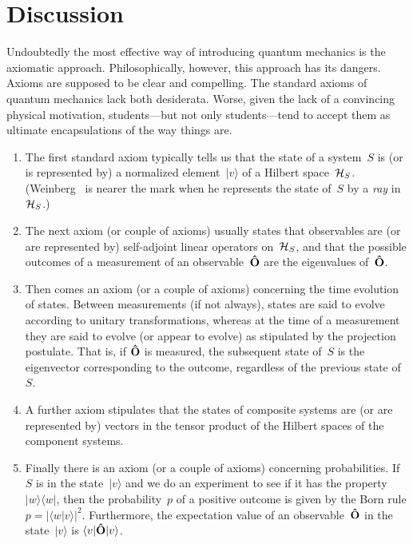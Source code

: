 \documentclass[12pt]{article}
\newcommand{\ket}[1]{\vert#1\rangle}
\newcommand{\braket}[2]{\langle#1\vert#2\rangle}
\newcommand{\ketbra}[2]{\vert#1\rangle\langle#2\vert}
\newcommand{\sandwich}[3]{\langle#1\vert#2\vert#3\rangle}
\newcommand{\ben}{\begin{enumerate}}
\newcommand{\een}{\end{enumerate}}
\newcommand{\cH}{{\cal H}}
\newcommand{\hO}{{\bf\hat O}}
\begin{document}
\section{Discussion}
Undoubtedly the most effective way of introducing quantum mechanics is the axiomatic approach. Philosophically, however, this approach has its dangers. Axioms are supposed to be clear and compelling. The standard axioms of quantum mechanics lack both desiderata. Worse, given the lack of a convincing physical motivation, students---but not only students---tend to accept them as ultimate encapsulations of the way things are.
\ben
\item The first standard axiom typically tells us that the state of a system~$S$ is (or is represented by) a normalized element~$\ket v$ of a Hilbert space~$\cH_S$. (Weinberg~\cite{WeinbergQFT} is nearer the mark when he represents the state of~$S$ by a \textit{ray} in~$\cH_S$.)
\item The next axiom (or couple of axioms) usually states that observables are (or are represented by) self-adjoint linear operators on~$\cH_S$, and that the possible outcomes of a measurement of an observable~$\hO$ are the eigenvalues of~$\hO$.
\item Then comes an axiom (or a couple of axioms) concerning the time evolution of states. Between measurements (if not always), states are said to evolve according to unitary transformations, whereas at the time of a measurement they are said to evolve (or appear to evolve) as stipulated by the projection postulate. That is, if $\hO$ is measured, the subsequent state of~$S$ is the eigenvector corresponding to the outcome, regardless of the previous state of~$S$.
\item A further axiom stipulates that the states of composite systems are (or are represented by) vectors in the tensor product of the Hilbert spaces of the component systems.
\item Finally there is an axiom (or a couple of axioms) concerning probabilities. If $S$ is in the state~$\ket v$ and we do an experiment to see if it has the property $\ketbra ww$, then the probability~$p$ of a positive outcome is given by the Born rule $p=|\braket wv|^2$. Furthermore, the expectation value of an observable~$\hO$ in the state~$\ket v$ is $\sandwich v\hO v$.
\een
\end{document}
